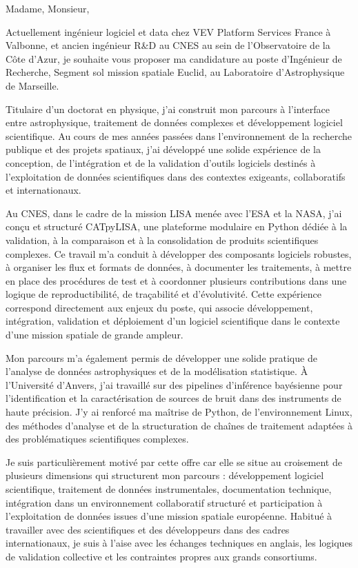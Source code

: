 \documentclass[11pt,a4paper]{altacv}
\begin{document}
{Madame, Monsieur,

Actuellement ingénieur logiciel et data chez VEV Platform Services France à Valbonne, et ancien ingénieur R\&D au CNES au sein de l’Observatoire de la Côte d’Azur, je souhaite vous proposer ma candidature au poste d’Ingénieur de Recherche, Segment sol mission spatiale Euclid, au Laboratoire d’Astrophysique de Marseille.

Titulaire d’un doctorat en physique, j’ai construit mon parcours à l’interface entre astrophysique, traitement de données complexes et développement logiciel scientifique. Au cours de mes années passées dans l’environnement de la recherche publique et des projets spatiaux, j’ai développé une solide expérience de la conception, de l’intégration et de la validation d’outils logiciels destinés à l’exploitation de données scientifiques dans des contextes exigeants, collaboratifs et internationaux.

Au CNES, dans le cadre de la mission LISA menée avec l’ESA et la NASA, j’ai conçu et structuré CATpyLISA, une plateforme modulaire en Python dédiée à la validation, à la comparaison et à la consolidation de produits scientifiques complexes. Ce travail m’a conduit à développer des composants logiciels robustes, à organiser les flux et formats de données, à documenter les traitements, à mettre en place des procédures de test et à coordonner plusieurs contributions dans une logique de reproductibilité, de traçabilité et d’évolutivité. Cette expérience correspond directement aux enjeux du poste, qui associe développement, intégration, validation et déploiement d’un logiciel scientifique dans le contexte d’une mission spatiale de grande ampleur.

Mon parcours m’a également permis de développer une solide pratique de l’analyse de données astrophysiques et de la modélisation statistique. À l’Université d’Anvers, j’ai travaillé sur des pipelines d’inférence bayésienne pour l’identification et la caractérisation de sources de bruit dans des instruments de haute précision. J’y ai renforcé ma maîtrise de Python, de l’environnement Linux, des méthodes d’analyse et de la structuration de chaînes de traitement adaptées à des problématiques scientifiques complexes.

Je suis particulièrement motivé par cette offre car elle se situe au croisement de plusieurs dimensions qui structurent mon parcours : développement logiciel scientifique, traitement de données instrumentales, documentation technique, intégration dans un environnement collaboratif structuré et participation à l’exploitation de données issues d’une mission spatiale européenne. Habitué à travailler avec des scientifiques et des développeurs dans des cadres internationaux, je suis à l’aise avec les échanges techniques en anglais, les logiques de validation collective et les contraintes propres aux grands consortiums.

}
\end{document}
